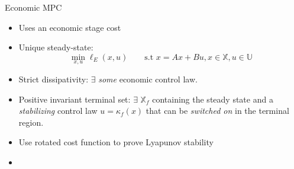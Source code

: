 \documentclass[table]{beamer}
\newcommand{\set}[1]{\left\lbrace #1 \right\rbrace}
\begin{document}
{
\begin{frame}{Economic MPC}
\begin{itemize}
\item Uses an economic stage cost
\item {\alert{Unique steady-state}}: \[\min_{x,u}{\ell_E(x,u)} \qquad
    \text{s.t~} x = Ax+Bu, x \in \mathbb{X}, u \in \mathbb{U}\]  
\item {\alert{Strict dissipativity}}: $\exists$ {\em{some}} economic control law.  
\item {\alert{Positive invariant terminal set}}: $\exists$
    $\mathbb{X}_f$ containing the steady state and a {\em{stabilizing}} control law $u = \kappa_f(x)$ that can be {\em{switched on}} in the terminal region.
\item Use rotated cost function to prove Lyapunov stability
\item {\color{blue}{ Design guidelines to stabilize closed-loop for
    systems optimizing process economics}}
\end{itemize}
\end{frame}
}
\end{document}
